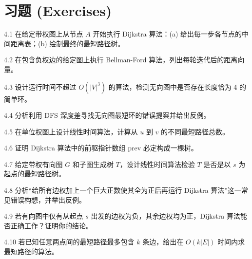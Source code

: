 \newpage
\section*{习题 (Exercises)}

\begin{exercise}{4.1}
在给定带权图上从节点 $A$ 开始执行 Dijkstra 算法：(a) 给出每一步各节点的中间距离表；(b) 绘制最终的最短路径树。
\end{exercise}

\begin{exercise}{4.2}
在包含负权边的给定图上执行 Bellman-Ford 算法，列出每轮迭代后的距离向量。
\end{exercise}

\begin{exercise}{4.3}
设计运行时间不超过 $O(|V|^3)$ 的算法，检测无向图中是否存在长度恰为 4 的简单环。
\end{exercise}

\begin{exercise}{4.4}
分析利用 DFS 深度差寻找无向图最短环的错误提案并给出反例。
\end{exercise}

\begin{exercise}{4.5}
在单位权图上设计线性时间算法，计算从 $u$ 到 $v$ 的不同最短路径总数。
\end{exercise}

\begin{exercise}{4.6}
证明 Dijkstra 算法中的前驱指针数组 $\text{prev}$ 必定构成一棵树。
\end{exercise}

\begin{exercise}{4.7}
给定带权有向图 $G$ 和子图生成树 $T$，设计线性时间算法检验 $T$ 是否是以 $s$ 为起点的最短路径树。
\end{exercise}

\begin{exercise}{4.8}
分析“给所有边权加上一个巨大正数使其全为正后再运行 Dijkstra 算法”这一常见错误构想，并举出反例。
\end{exercise}

\begin{exercise}{4.9}
若有向图中仅有从起点 $s$ 出发的边权为负，其余边权均为正，Dijkstra 算法能否正确工作？证明你的结论。
\end{exercise}

\begin{exercise}{4.10}
若已知任意两点间的最短路径最多包含 $k$ 条边，给出在 $O(k|E|)$ 时间内求最短路径的算法。
\end{exercise}

